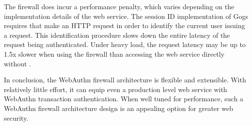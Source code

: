 The firewall does incur a performance penalty, which varies depending on the implementation details of the web service. The session ID implementation of Gogs requires that \sys{} make an HTTP request in order to identify the current user issuing a request. This identification procedure slows down the entire latency of the request being authenticated. Under heavy load, the request latency may be up to 1.5x slower when using the firewall than accessing the web service directly without \sys{}.



In conclusion, the WebAuthn firewall architecture is flexible and extensible. With relatively little effort, it can equip even a production level web service with WebAuthn transaction authentication. When well tuned for performance, such a WebAuthn firewall architecture design is an appealing option for greater web security.




